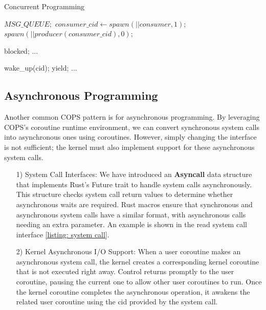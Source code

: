 \documentclass[conference]{IEEEtran}
\begin{document}
\begin{algorithm}[!h]
  \caption{Concurrent Programming}
  \label{alg: concurrency}
  \begin{algorithmic}[1]
    \State $MSG\_QUEUE;$
      \State $consumer\_cid \gets spawn(|| consumer, 1)$;
      \State $spawn(|| producer(consumer\_cid), 0)$;
		\EndFunction

      \Loop
          \State blocked;
        \EndWhile
        \State ... 
      \EndLoop
    \EndFunction

      \Loop
          \State wake\_up(cid); 
          \State yield;
        \EndWhile
        \State ... 
      \EndLoop
    \EndFunction
  \end{algorithmic}
\end{algorithm}

\subsection{Asynchronous Programming}

Another common COPS pattern is for asynchronous programming. By leveraging COPS's coroutine runtime environment, we can convert synchronous system calls into asynchronous ones using coroutines. However, simply changing the interface is not sufficient; the kernel must also implement support for these asynchronous system calls.

\begin{itemize}[leftmargin=*]
  \item[1)] System Call Interfaces: We have introduced an \textbf{Asyncall} data structure that implements Rust's Future trait to handle system calls asynchronously. This structure checks system call return values to determine whether asynchronous waits are required. Rust macros ensure that synchronous and asynchronous system calls have a similar format, with asynchronous calls needing an extra parameter. An example is shown in the read system call interface \ref{listing: system call}.
  \item[2)] Kernel Asynchronous I/O Support: When a user coroutine makes an asynchronous system call, the kernel creates a corresponding kernel coroutine that is not executed right away. Control returns promptly to the user coroutine, pausing the current one to allow other user coroutines to run. Once the kernel coroutine completes the asynchronous operation, it awakens the related user coroutine using the cid provided by the system call.
\end{itemize}
\end{document}
